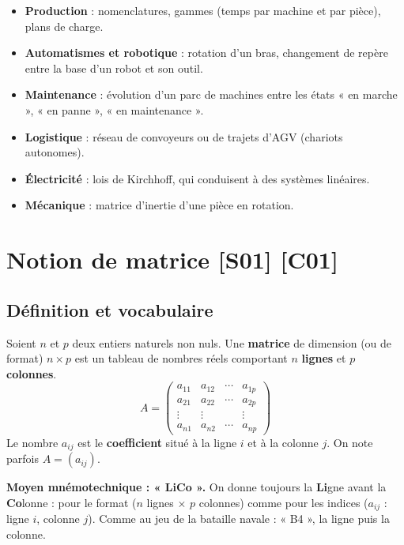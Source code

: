 \documentclass[a4paper,11pt]{article}
\newcommand{\M}[1]{\begin{pmatrix}#1\end{pmatrix}}
\begin{document}
\begin{remarque}
\begin{itemize}
  \item \textbf{Production} : nomenclatures, gammes (temps par machine et par pièce), plans de charge.
  \item \textbf{Automatismes et robotique} : rotation d'un bras, changement de repère entre la base d'un robot et son outil.
  \item \textbf{Maintenance} : évolution d'un parc de machines entre les états « en marche », « en panne », « en maintenance ».
  \item \textbf{Logistique} : réseau de convoyeurs ou de trajets d'AGV (chariots autonomes).
  \item \textbf{Électricité} : lois de Kirchhoff, qui conduisent à des systèmes linéaires.
  \item \textbf{Mécanique} : matrice d'inertie d'une pièce en rotation.
\end{itemize}
\end{remarque}

\needspace{7cm}
\section{Notion de matrice \hfill {\normalsize\color{uimmred}[S01] [C01]}}\label{sec:notion}

\subsection{Définition et vocabulaire}\label{subsec:def}

\begin{definition}[-- Matrice]
Soient $n$ et $p$ deux entiers naturels non nuls. Une \textbf{matrice} de dimension (ou de format) $n\times p$ est un tableau de nombres réels comportant $n$ \textbf{lignes} et $p$ \textbf{colonnes}.
\[
A = \M{a_{11} & a_{12} & \cdots & a_{1p}\\ a_{21} & a_{22} & \cdots & a_{2p}\\ \vdots & \vdots & & \vdots\\ a_{n1} & a_{n2} & \cdots & a_{np}}
\]
Le nombre $a_{ij}$ est le \textbf{coefficient} situé à la ligne $i$ et à la colonne $j$. On note parfois $A=(a_{ij})$.
\end{definition}

\begin{tcolorbox}[colback=white, colframe=uimmblue, boxrule=0.8pt, arc=3pt]
\textbf{Moyen mnémotechnique : « LiCo ».} On donne toujours la \textbf{Li}gne avant la \textbf{Co}lonne : pour le format ($n$ lignes $\times$ $p$ colonnes) comme pour les indices ($a_{ij}$ : ligne $i$, colonne $j$). Comme au jeu de la bataille navale : « B4 », la ligne puis la colonne.
\end{tcolorbox}
\end{document}
